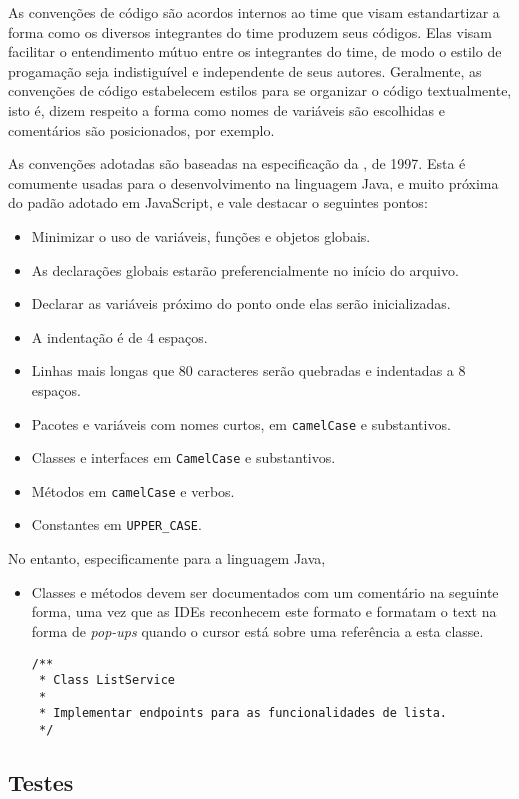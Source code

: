 As convenções de código são acordos internos ao time que visam
estandartizar a forma como os diversos integrantes do time produzem
seus códigos.  Elas visam facilitar o entendimento mútuo entre os
integrantes do time, de modo o estilo de progamação seja indistiguível
e independente de seus autores.  Geralmente, as convenções de código
estabelecem estilos para se organizar o código textualmente, isto é,
dizem respeito a forma como nomes de variáveis são escolhidas e
comentários são posicionados, por exemplo.

As convenções adotadas são baseadas na especificação da
\citeauthor{Oracle1997}, de 1997. Esta é comumente usadas para o
desenvolvimento na linguagem Java, e muito próxima do padão adotado em
JavaScript, e vale destacar o seguintes pontos:
\begin{itemize}
\item Minimizar o uso de variáveis, funções e objetos globais.
\item As declarações globais estarão preferencialmente no início do arquivo.
\item Declarar as variáveis próximo do ponto onde elas serão inicializadas.
\item A indentação é de 4 espaços.
\item Linhas mais longas que 80 caracteres serão quebradas e
  indentadas a 8 espaços.
\item Pacotes e variáveis com nomes curtos, em \texttt{camelCase} e substantivos.
\item Classes e interfaces em \texttt{CamelCase} e substantivos.
\item Métodos em \texttt{camelCase} e verbos.
\item Constantes em \texttt{UPPER\_CASE}.
\end{itemize}

No entanto, especificamente para a linguagem Java,
\begin{itemize}
\item Classes e métodos devem ser documentados com um comentário na
  seguinte forma, uma vez que as IDEs reconhecem este formato e
  formatam o text na forma de \emph{pop-ups} quando o cursor está
  sobre uma referência a esta classe.
\begin{verbatim}
/**
 * Class ListService
 *
 * Implementar endpoints para as funcionalidades de lista.
 */
\end{verbatim}
\end{itemize}

\subsection{Testes}

